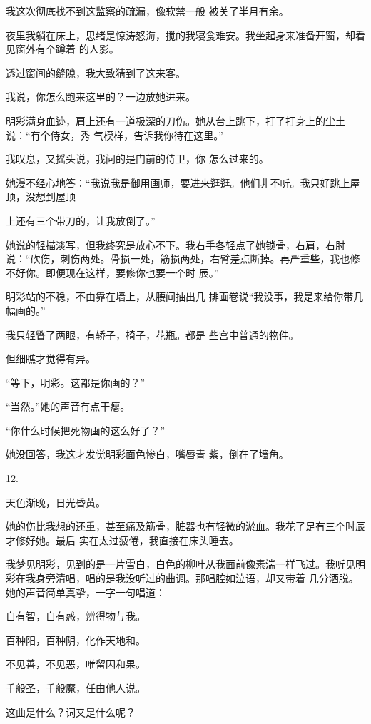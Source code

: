 \documentclass{article}
\begin{document}
我这次彻底找不到这监察的疏漏，像软禁一般
被关了半月有余。 

夜里我躺在床上，思绪是惊涛怒海，搅的我寝食难安。我坐起身来准备开窗，却看见窗外有个蹲着
的人影。 


透过窗间的缝隙，我大致猜到了这来客。 


我说，你怎么跑来这里的？一边放她进来。 

明彩满身血迹，肩上还有一道极深的刀伤。她从台上跳下，打了打身上的尘土说：“有个侍女，秀
气模样，告诉我你待在这里。” 

我叹息，又摇头说，我问的是门前的侍卫，你
怎么过来的。 

她漫不经心地答：“我说我是御用画师，要进来逛逛。他们非不听。我只好跳上屋顶，没想到屋顶
\newpage

上还有三个带刀的，让我放倒了。” 

她说的轻描淡写，但我终究是放心不下。我右手各轻点了她锁骨，右肩，右肘说：“砍伤，刺伤两处。骨损一处，筋损两处，右臂差点断掉。再严重些，我也修不好你。即便现在这样，要修你也要一个时
辰。” 

明彩站的不稳，不由靠在墙上，从腰间抽出几
排画卷说“我没事，我是来给你带几幅画的。” 

我只轻瞥了两眼，有轿子，椅子，花瓶。都是
些宫中普通的物件。 


但细瞧才觉得有异。 


“等下，明彩。这都是你画的？” 


“当然。”她的声音有点干瘪。 


\newpage

“你什么时候把死物画的这么好了？” 

她没回答，我这才发觉明彩面色惨白，嘴唇青
紫，倒在了墙角。 


12. 


天色渐晚，日光昏黄。 

她的伤比我想的还重，甚至痛及筋骨，脏器也有轻微的淤血。我花了足有三个时辰才修好她。最后
实在太过疲倦，我直接在床头睡去。 

我梦见明彩，见到的是一片雪白，白色的柳叶从我面前像素湍一样飞过。我听见明彩在我身旁清唱，唱的是我没听过的曲调。那唱腔如泣语，却又带着
几分洒脱。她的声音简单真挚，一字一句唱道： 


自有智，自有惑，辨得物与我。 


百种阳，百种阴，化作天地和。 

\newpage


不见善，不见恶，唯留因和果。 


千般圣，千般魔，任由他人说。 


这曲是什么？词又是什么呢？ 
\end{document}

